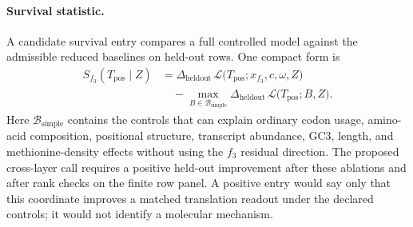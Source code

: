 \paragraph{Survival statistic.} A candidate survival entry compares a full controlled model against the admissible reduced baselines on held-out rows.  One compact form is
$$
\begin{aligned}
  S_{f_3}(T_{\mathrm{pos}}\mid Z)
  &= \Delta_{\mathrm{heldout}}\,\mathcal{L}\bigl(T_{\mathrm{pos}};
       x_{f_3}, c, \omega, Z\bigr) \\
  &\quad - \max_{B\in\mathcal{B}_{\mathrm{simple}}}
       \Delta_{\mathrm{heldout}}\,\mathcal{L}\bigl(T_{\mathrm{pos}}; B, Z\bigr).
\end{aligned}
$$
Here $\mathcal{B}_{\mathrm{simple}}$ contains the controls that can explain ordinary codon usage, amino-acid composition, positional structure, transcript abundance, GC3, length, and methionine-density effects without using the $f_3$ residual direction.  The proposed cross-layer call requires a positive held-out improvement after these ablations and after rank checks on the finite row panel.  A positive entry would say only that this coordinate improves a matched translation readout under the declared controls; it would not identify a molecular mechanism.
